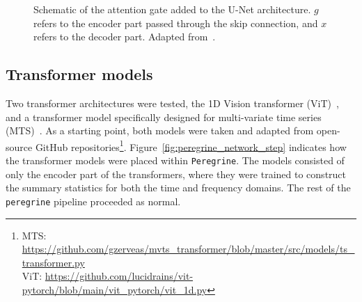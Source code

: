\begin{figure}[htb]
\centering
{}
\caption{Schematic of the attention gate added to the U-Net architecture. $g$ refers to the encoder part passed through the skip connection, and $x$ refers to the decoder part. Adapted from~\cite{Oktay_2018_AUNet}.}
\label{fig:attention_gate}
\myvspacecommand
\end{figure}

\subsection{Transformer models}

Two transformer architectures were tested, the 1D Vision transformer (ViT)~\cite{Dosovitskiy_2021_ViT}, and a transformer model specifically designed for multi-variate time series (MTS)~\cite{Zerveas_2020_mvts}. As a starting point, both models were taken and adapted from open-source GitHub repositories\footnote{MTS: \url{https://github.com/gzerveas/mvts_transformer/blob/master/src/models/ts_transformer.py}\\
ViT: \url{https://github.com/lucidrains/vit-pytorch/blob/main/vit_pytorch/vit_1d.py}}. Figure~\ref{fig:peregrine_network_step} indicates how the transformer models were placed within \texttt{Peregrine}. The models consisted of only the encoder part of the transformers, where they were trained to construct the summary statistics for both the time and frequency domains. The rest of the \texttt{peregrine} pipeline proceeded as normal. 

